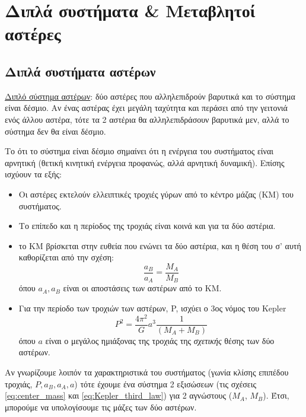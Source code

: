 \chapter{Διπλά συστήματα \& Μεταβλητοί αστέρες}
\label{ch:Chapter7}

\section{Διπλά συστήματα αστέρων}


\underline{Διπλό σύστημα αστέρων}: {\color{blue}δύο αστέρες που αλληλεπιδρούν βαρυτικά και το σύστημα είναι δέσμιο.} Αν ένας αστέρας έχει μεγάλη ταχύτητα και περάσει από την γειτονιά ενός άλλου αστέρα, τότε τα 2 αστέρια θα αλληλεπιδράσουν βαρυτικά μεν, αλλά το σύστημα δεν θα είναι δέσμιο.

Το ότι το σύστημα είναι δέσμιο σημαίνει ότι η ενέργεια του συστήματος είναι αρνητική (θετική κινητική ενέργεια προφανώς, αλλά αρνητική δυναμική). Επίσης ισχύουν τα εξής:

\begin{itemize}
    \item Οι αστέρες εκτελούν ελλειπτικές τροχιές γύρων από το κέντρο μάζας (ΚΜ) του συστήματος.
    \item Το επίπεδο και η περίοδος της τροχιάς είναι κοινά και για τα δύο αστέρια.
    \item το ΚΜ βρίσκεται στην ευθεία που ενώνει τα δύο αστέρια, και η θέση του σ' αυτή καθορίζεται από την σχέση:
        \begin{equation}
            \label{eq:center_mass}
            \frac{a_B}{a_A} = \frac{M_A}{M_B}
        \end{equation}
        όπου $a_A, a_B$ είναι οι αποστάσεις των αστέρων από το ΚΜ.
    \item Για την περίοδο των τροχιών των αστέρων, P, ισχύει ο 3ος νόμος του Kepler
        \begin{equation}
            \label{eq:Kepler_third_law}
            P^2 = \frac{4\pi^2}{G}a^3 \frac{1}{(M_A + M_B)}
        \end{equation}
        όπου $a$ είναι ο μεγάλος ημιάξονας της τροχιάς της \textit{σχετικής} θέσης των δύο αστέρων.
\end{itemize}

Αν γνωρίζουμε λοιπόν τα χαρακτηριστικά του συστήματος (γωνία κλίσης επιπέδου τροχιάς, $P, a_B, a_A, a$) τότε έχουμε ένα σύστημα 2 εξισώσεων (τις σχέσεις \eqref{eq:center_mass} και \eqref{eq:Kepler_third_law}) για 2 αγνώστους ($M_A$, $M_B$).  Έτσι, μπορούμε να υπολογίσουμε τις μάζες των δύο αστέρων.






